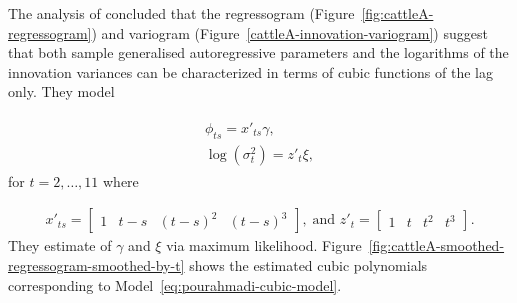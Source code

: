 \documentclass[12pt]{article}
\theoremstyle{definition}
\begin{document}
The analysis of \citet{pourahmadi1999joint} concluded that the regressogram (Figure~\ref{fig:cattleA-regressogram}) and variogram (Figure~\ref{cattleA-innovation-variogram}) suggest that both sample generalised autoregressive parameters and the logarithms of the innovation variances can be characterized in terms of cubic functions of the lag only. They model 

\begin{align}
\begin{split} \label{eq:pourahmadi-cubic-model}
\phi_{ts} = x'_{ts}\gamma, \\
\log\left(\sigma_t^2\right) = z'_{t}\xi, 
\end{split}
\end{align}
\noindent
for $t = 2,\dots, 11$ where 

\begin{align*}
x'_{ts} = \begin{bmatrix} 1 & t - s& \left(t - s\right)^2 & \left(t - s\right)^3 \end{bmatrix},\; \mbox{and } z'_{t} = \begin{bmatrix} 1 & t& t^2& t^3 \end{bmatrix}.
\end{align*}
\noindent
They estimate of $\gamma$ and $\xi$ via maximum likelihood.  Figure~\ref{fig:cattleA-smoothed-regressogram-smoothed-by-t} shows the estimated cubic polynomials corresponding to Model~\ref{eq:pourahmadi-cubic-model}. 
\end{document}
